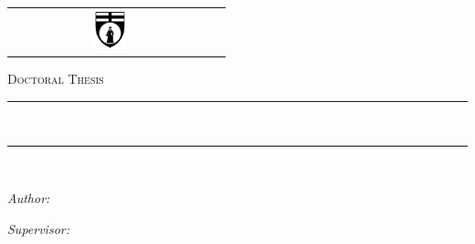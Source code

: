 \begin{titlepage}
\addtocounter{page}{-1}
\begin{center}

\begin{tabular}{cc}
    \includegraphics[align=c, width=0.18\textwidth]{Covers/unige_logo_bw.png} &  
    {\scshape \huge \darkred{\univname}} %
\end{tabular}

\vspace{0.5cm}
\textsc{\Large Doctoral Thesis}\\[0.5cm] %


\rule[0.4cm]{13cm}{0.1pt}\\%
{\huge \bfseries \ttitle\par}\vspace{0.4cm} %
\rule{13cm}{0.1pt}\\ \vspace{1.5cm}
 
\begin{minipage}[t]{0.4\textwidth}
\begin{flushleft} \large
\emph{Author:}\\
\href{http://#}{\authorname} %
\end{flushleft}
\end{minipage}
\begin{minipage}[t]{0.4\textwidth}
\begin{flushright} \large
\emph{Supervisor:} \\
\href{https://www.iit.it/people/tommaso-fellin}{\supname} \\ %
\end{flushright}
\end{minipage}\\[1.6cm]
 

\end{center}
\end{titlepage}
